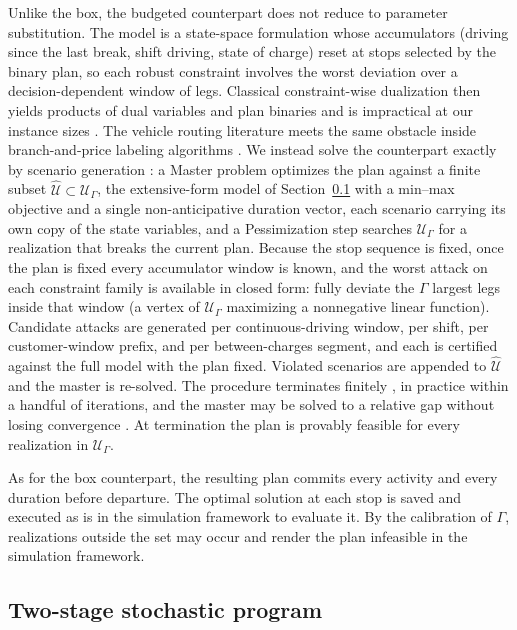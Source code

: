Unlike the box, the budgeted counterpart does not reduce to parameter substitution. The model is a state-space formulation whose accumulators (driving since the last break, shift driving, state of charge) reset at stops selected by the binary plan, so each robust constraint involves the worst deviation over a decision-dependent window of legs. Classical constraint-wise dualization then yields products of dual variables and plan binaries and is impractical at our instance sizes \citep{poss_robust_2013}. The vehicle routing literature meets the same obstacle inside branch-and-price labeling algorithms \citep{munari_robust_2019}.
We instead solve the counterpart exactly by scenario generation \citep{mutapcic_cutting-set_2009, zeng_solving_2013}: a Master problem optimizes the plan against a finite subset $\widehat{\mathcal U} \subset \mathcal U_\Gamma$, the extensive-form model of Section~\ref{sec:sp} with a min--max objective and a single non-anticipative duration vector, each scenario carrying its own copy of the state variables, and a Pessimization step searches $\mathcal U_\Gamma$ for a realization that breaks the current plan. Because the stop sequence is fixed, once the plan is fixed every accumulator window is known, and the worst attack on each constraint family is available in closed form: fully deviate the $\Gamma$ largest legs inside that window (a vertex of $\mathcal U_\Gamma$ maximizing a nonnegative linear function). Candidate attacks are generated per continuous-driving window, per shift, per customer-window prefix, and per between-charges segment, and each is certified against the full model with the plan fixed. Violated scenarios are appended to $\widehat{\mathcal U}$ and the master is re-solved. The procedure terminates finitely \citep{zeng_solving_2013}, in practice within a handful of iterations, and the master may be solved to a relative gap without losing convergence \citep{patzold_approximate_2020}. At termination the plan is provably feasible for every realization in $\mathcal U_\Gamma$.

As for the box counterpart, the resulting plan commits every activity and every duration before departure. The optimal solution at each stop is saved and executed as is in the simulation framework to evaluate it. By the calibration of $\Gamma$, realizations outside the set may occur and render the plan infeasible in the simulation framework.

\subsection{Two-stage stochastic program}
\label{sec:sp}

